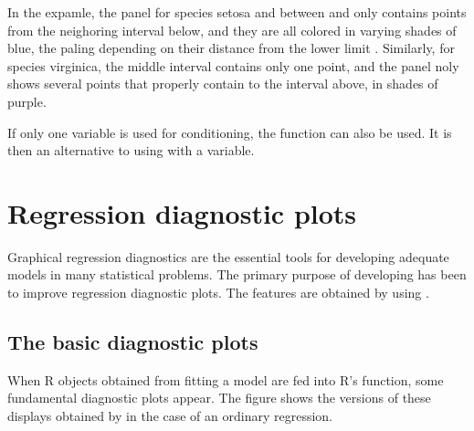 \documentclass[11pt]{article}\usepackage[]{graphicx}\usepackage[]{color}
\begin{document}
In the expamle, the panel for species setosa and  between
 and  only contains points from the neighoring interval
below, and they are all colored in varying shades of blue, the paling
depending on their distance from the lower limit .
Similarly, for species virginica, the middle interval contains only one 
point, and the panel noly shows several points that properly contain to the
interval above, in shades of purple.

If only one variable is used for conditioning, the function can also 
be used. It is then an alternative to using  with 
a  variable.

\section{Regression diagnostic plots}
Graphical regression diagnostics are the essential tools for developing
adequate models in many statistical problems.
The primary purpose of developing  has been to improve
regression diagnostic plots.
The features are obtained by using .

\subsection{The basic diagnostic plots}
When R objects obtained from fitting a model are fed into R's 
function, some fundamental diagnostic plots appear. 
The figure shows the versions of these displays obtained by 
in the case of an ordinary regression.
\end{document}

